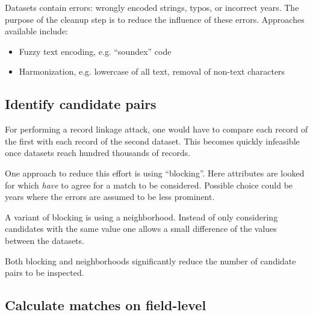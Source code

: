 \documentclass[sigconf,nonacm]{acmart}
\begin{document}
Datasets contain errors: wrongly encoded strings, typos, or
incorrect years.
The purpose of the cleanup step is to reduce the influence of these
errors.
Approaches available include:
\begin{itemize}
\item Fuzzy text encoding, e.g. ``soundex'' code
\item Harmonization, e.g. lowercase of all text, removal of non-text characters
\end{itemize}

\subsection{Identify candidate pairs}

For performing a record linkage attack, one would have to compare each
record of the first with each record of the second dataset.
This becomes quickly infeasible once datasets reach hundred thousands
of records.

One approach to reduce this effort is using ``blocking''.
Here attributes are looked for which \emph{have} to agree for a
match to be considered.
Possible choice could be years where the errors are assumed to be
less prominent.

A variant of blocking is using a neighborhood. Instead of only
considering candidates with the same value one allows a small
difference of the values between the datasets.

Both blocking and neighborhoods significantly reduce the number
of candidate pairs to be inspected.

\subsection{Calculate matches on field-level}
\end{document}
